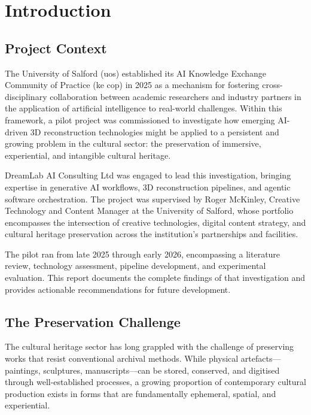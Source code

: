 \chapter{Introduction}
\label{ch:introduction}

\section{Project Context}
\label{sec:intro-context}

The University of Salford (\acrshort{uos}) established its AI Knowledge Exchange Community of Practice (\acrshort{ke} \acrshort{cop}) in 2025 as a mechanism for fostering cross-disciplinary collaboration between academic researchers and industry partners in the application of artificial intelligence to real-world challenges. Within this framework, a pilot project was commissioned to investigate how emerging AI-driven 3D reconstruction technologies might be applied to a persistent and growing problem in the cultural sector: the preservation of immersive, experiential, and intangible cultural heritage.

DreamLab AI Consulting Ltd was engaged to lead this investigation, bringing expertise in generative AI workflows, 3D reconstruction pipelines, and agentic software orchestration. The project was supervised by Roger McKinley, Creative Technology and Content Manager at the University of Salford, whose portfolio encompasses the intersection of creative technologies, digital content strategy, and cultural heritage preservation across the institution's partnerships and facilities.

The pilot ran from late 2025 through early 2026, encompassing a literature review, technology assessment, pipeline development, and experimental evaluation. This report documents the complete findings of that investigation and provides actionable recommendations for future development.

\section{The Preservation Challenge}
\label{sec:intro-challenge}

The cultural heritage sector has long grappled with the challenge of preserving works that resist conventional archival methods. While physical artefacts---paintings, sculptures, manuscripts---can be stored, conserved, and digitised through well-established processes, a growing proportion of contemporary cultural production exists in forms that are fundamentally ephemeral, spatial, and experiential.


